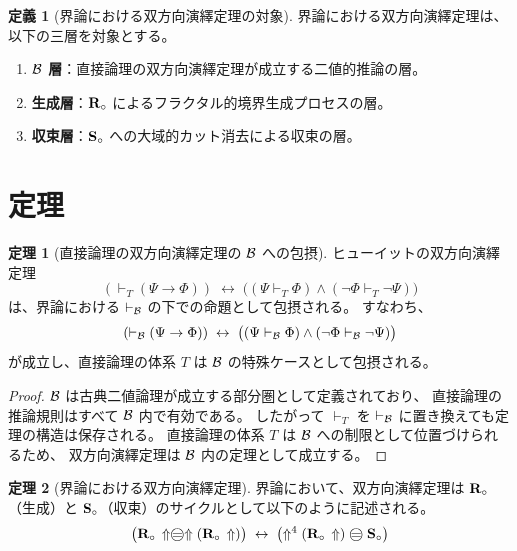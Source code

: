 \documentclass[11pt,a4paper]{ltjsarticle}
\theoremstyle{definition}
\newtheorem{definition}{定義}[section]
\newtheorem{theorem}{定理}[section]
\begin{document}
\begin{definition}[界論における双方向演繹定理の対象]
界論における双方向演繹定理は、以下の三層を対象とする。
\begin{enumerate}
\item \textbf{$\mathcal{B}$ 層}：直接論理の双方向演繹定理が成立する二値的推論の層。
\item \textbf{生成層}：$\mathbf{R}_{\circ}$ によるフラクタル的境界生成プロセスの層。
\item \textbf{収束層}：$\mathbf{S}_{\circ}$ への大域的カット消去による収束の層。
\end{enumerate}
\end{definition}

\section{定理}

\begin{theorem}[直接論理の双方向演繹定理の $\mathcal{B}$ への包摂]
ヒューイットの双方向演繹定理
\[
(\vdash_T (\Psi \to \Phi))
\;\leftrightarrow\;
\bigl((\Psi \vdash_T \Phi) \land (\neg\Phi \vdash_T \neg\Psi)\bigr)
\]
は、界論における $\vdash_{\mathcal{B}}$ の下での命題として包摂される。
すなわち、
\[
(\vdash_{\mathcal{B}} (\Psi \to \Phi))
\;\leftrightarrow\;
\bigl((\Psi \vdash_{\mathcal{B}} \Phi) \land (\neg\Phi \vdash_{\mathcal{B}} \neg\Psi)\bigr)
\]
が成立し、直接論理の体系 $T$ は $\mathcal{B}$ の特殊ケースとして包摂される。
\end{theorem}

\begin{proof}
$\mathcal{B}$ は古典二値論理が成立する部分圏として定義されており、
直接論理の推論規則はすべて $\mathcal{B}$ 内で有効である。
したがって $\vdash_T$ を $\vdash_{\mathcal{B}}$ に置き換えても定理の構造は保存される。
直接論理の体系 $T$ は $\mathcal{B}$ への制限として位置づけられるため、
双方向演繹定理は $\mathcal{B}$ 内の定理として成立する。
\end{proof}

\begin{theorem}[界論における双方向演繹定理]
\label{thm:bdt}
界論において、双方向演繹定理は $\mathbf{R}_{\circ}$（生成）と
$\mathbf{S}_{\circ}$（収束）のサイクルとして以下のように記述される。
\[
\bigl(\Rmw\,\metanegation \mweq \metanegation(\Rmw\,\metanegation)\bigr)
\;\leftrightarrow\;
\bigl(\metanegation^4(\Rmw\,\metanegation) \mweq \Svoid\bigr)
\]
\end{theorem}
\end{document}
